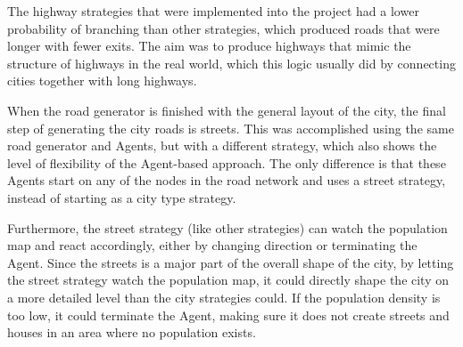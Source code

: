 The highway strategies that were implemented into the project had a lower probability of branching than other strategies, which produced roads that were longer with fewer exits.
The aim was to produce highways that mimic the structure of highways in the real world, which this logic usually did by connecting cities together with long highways.

When the road generator is finished with the general layout of the city, the final step of generating the city roads is streets.
This was accomplished using the same road generator and Agents, but with a different strategy, which also shows the level of flexibility of the Agent-based approach.
The only difference is that these Agents start on any of the nodes in the road network and uses a street strategy, instead of starting as a city type strategy.

Furthermore, the street strategy (like other strategies) can watch the population map and react accordingly, either by changing direction or terminating the Agent.
Since the streets is a major part of the overall shape of the city, by letting the street strategy watch the population map, it could directly shape the city on a more detailed level than the city strategies could.
If the population density is too low, it could terminate the Agent, making sure it does not create streets and houses in an area where no population exists.
